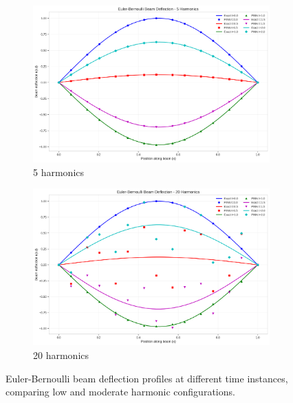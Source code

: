 \begin{figure}[H]
    \centering
    \begin{subfigure}[b]{0.48\textwidth}
        \centering
        \includegraphics[width=\textwidth]{figures/euler_bernoulli_beam_5h.png}
        \caption{5 harmonics}
    \end{subfigure}
    \hfill
    \begin{subfigure}[b]{0.48\textwidth}
        \centering
        \includegraphics[width=\textwidth]{figures/euler_bernoulli_beam_20h.png}
        \caption{20 harmonics}
    \end{subfigure}
    \caption{Euler-Bernoulli beam deflection profiles at different time instances, comparing low and moderate harmonic configurations.}
    \label{fig:beam_comparison}
\end{figure}

